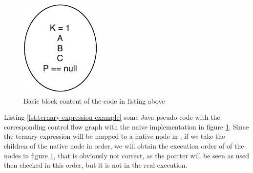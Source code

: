 \begin{figure}[h]
	\caption{Basic block content of the code in listing above}
	\label{figure:basic-block-content}
	\includegraphics[]{figure/basic-block-content.pdf}
\end{figure}


Listing \ref{lst:ternary-expression-example} some Java pseudo code with the corresponding control flow graph with the naive implementation in figure \ref{figure:basic-block-content}.
Since the ternary expression will be mapped to a native node in \slang{}, if we take the children of the native node in order, we will obtain the execution order of of the nodes in figure \ref{figure:basic-block-content}, that is obviously not correct, as the pointer will be seen as used then checked in this order, but it is not in the real execution.

